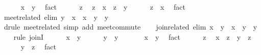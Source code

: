 \begin{isabellebody}
\isanewline
\ \ \ \ \isamarkupfalse%
\ {\isachardoublequoteopen}x\ {\isasymsqsubseteq}\ y{\isachardoublequoteclose}\ \isamarkupfalse%
\ fact\isanewline
\ \ \ \ \isamarkupfalse%
\ z\ \isamarkupfalse%
\ {\isachardoublequoteopen}z\ {\isasymsqsubseteq}\ x{\isachardoublequoteclose}\ \ {\isachardoublequoteopen}z\ {\isasymsqsubseteq}\ y{\isachardoublequoteclose}\isanewline
\ \ \ \ \isamarkupfalse%
\ {\isachardoublequoteopen}z\ {\isasymsqsubseteq}\ x{\isachardoublequoteclose}\ \isamarkupfalse%
\ fact\isanewline
\ \ \isamarkupfalse%
\isanewline
\isanewline
\ \ \isamarkupfalse%
\ meet{\isacharunderscore}related{}\ {\isacharbrackleft}elim{\isacharquery}{\isacharbrackright}{\isacharcolon}\ {\isachardoublequoteopen}y\ {\isasymsqsubseteq}\ x\ {\isasymLongrightarrow}\ x\ {\isasymsqinter}\ y\ {\isacharequal}\ y{\isachardoublequoteclose}\isanewline
\ \ \ \ \isamarkupfalse%
\ {\isacharparenleft}drule\ meet{\isacharunderscore}related{\isacharparenright}\ {\isacharparenleft}simp\ add{\isacharcolon}\ meet{\isacharunderscore}commute{\isacharparenright}\isanewline
\isanewline
\ \ \isamarkupfalse%
\ join{\isacharunderscore}related\ {\isacharbrackleft}elim{\isacharquery}{\isacharbrackright}{\isacharcolon}\ {\isachardoublequoteopen}x\ {\isasymsqsubseteq}\ y\ {\isasymLongrightarrow}\ x\ {\isasymsqunion}\ y\ {\isacharequal}\ y{\isachardoublequoteclose}\isanewline
\ \ \isamarkupfalse%
\ {\isacharparenleft}rule\ joinI{\isacharparenright}\isanewline
\ \ \ \ \isamarkupfalse%
\ {\isachardoublequoteopen}x\ {\isasymsqsubseteq}\ y{\isachardoublequoteclose}\isanewline
\ \ \ \ \isamarkupfalse%
\ {\isachardoublequoteopen}y\ {\isasymsqsubseteq}\ y{\isachardoublequoteclose}\ \isacommand{{\isachardot}{\isachardot}}\isamarkupfalse%
\isanewline
\ \ \ \ \isamarkupfalse%
\ {\isachardoublequoteopen}x\ {\isasymsqsubseteq}\ y{\isachardoublequoteclose}\ \isamarkupfalse%
\ fact\isanewline
\ \ \ \ \isamarkupfalse%
\ z\ \isamarkupfalse%
\ {\isachardoublequoteopen}x\ {\isasymsqsubseteq}\ z{\isachardoublequoteclose}\ \ {\isachardoublequoteopen}y\ {\isasymsqsubseteq}\ z{\isachardoublequoteclose}\isanewline
\ \ \ \ \isamarkupfalse%
\ {\isachardoublequoteopen}y\ {\isasymsqsubseteq}\ z{\isachardoublequoteclose}\ \isamarkupfalse%
\ fact\isanewline
\ \ \isamarkupfalse%

\end{isabellebody}
